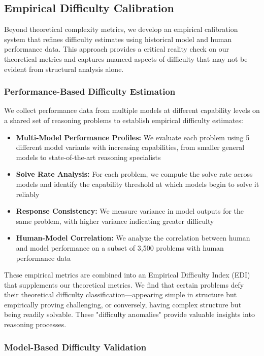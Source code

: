 \subsection{Empirical Difficulty Calibration}

Beyond theoretical complexity metrics, we develop an empirical calibration system that refines difficulty estimates using historical model and human performance data. This approach provides a critical reality check on our theoretical metrics and captures nuanced aspects of difficulty that may not be evident from structural analysis alone.

\subsubsection{Performance-Based Difficulty Estimation}

We collect performance data from multiple models at different capability levels on a shared set of reasoning problems to establish empirical difficulty estimates:

\begin{itemize}
    \item \textbf{Multi-Model Performance Profiles:} We evaluate each problem using 5 different model variants with increasing capabilities, from smaller general models to state-of-the-art reasoning specialists
    \item \textbf{Solve Rate Analysis:} For each problem, we compute the solve rate across models and identify the capability threshold at which models begin to solve it reliably
    \item \textbf{Response Consistency:} We measure variance in model outputs for the same problem, with higher variance indicating greater difficulty
    \item \textbf{Human-Model Correlation:} We analyze the correlation between human and model performance on a subset of 3,500 problems with human performance data
\end{itemize}

These empirical metrics are combined into an Empirical Difficulty Index (EDI) that supplements our theoretical metrics. We find that certain problems defy their theoretical difficulty classification—appearing simple in structure but empirically proving challenging, or conversely, having complex structure but being readily solvable. These "difficulty anomalies" provide valuable insights into reasoning processes.

\subsubsection{Model-Based Difficulty Validation}

